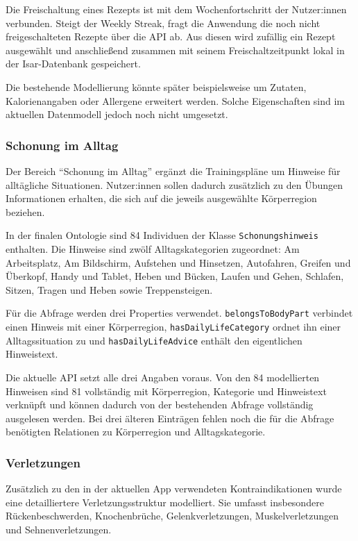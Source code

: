 Die Freischaltung eines Rezepts ist mit dem Wochenfortschritt der Nutzer:innen verbunden. Steigt der Weekly Streak, fragt die Anwendung die noch nicht freigeschalteten Rezepte über die API ab. Aus diesen wird zufällig ein Rezept ausgewählt und anschließend zusammen mit seinem Freischaltzeitpunkt lokal in der Isar-Datenbank gespeichert.

Die bestehende Modellierung könnte später beispielsweise um Zutaten, Kalorienangaben oder Allergene erweitert werden. Solche Eigenschaften sind im aktuellen Datenmodell jedoch noch nicht umgesetzt.

\subsubsection{Schonung im Alltag}
\label{sec:ontologie-schonung}

Der Bereich ``Schonung im Alltag'' ergänzt die Trainingspläne um Hinweise für alltägliche Situationen. Nutzer:innen sollen dadurch zusätzlich zu den Übungen Informationen erhalten, die sich auf die jeweils ausgewählte Körperregion beziehen.

In der finalen Ontologie sind 84 Individuen der Klasse \texttt{Schonungshinweis} enthalten. Die Hinweise sind zwölf Alltagskategorien zugeordnet: Am Arbeitsplatz, Am Bildschirm, Aufstehen und Hinsetzen, Autofahren, Greifen und Überkopf, Handy und Tablet, Heben und Bücken, Laufen und Gehen, Schlafen, Sitzen, Tragen und Heben sowie Treppensteigen.


Für die Abfrage werden drei Properties verwendet. \texttt{belongsToBodyPart} verbindet einen Hinweis mit einer Körperregion, \texttt{hasDailyLifeCategory} ordnet ihn einer Alltagssituation zu und \texttt{hasDailyLifeAdvice} enthält den eigentlichen Hinweistext.

Die aktuelle API setzt alle drei Angaben voraus. Von den 84 modellierten Hinweisen sind 81 vollständig mit Körperregion, Kategorie und Hinweistext verknüpft und können dadurch von der bestehenden Abfrage vollständig ausgelesen werden. Bei drei älteren Einträgen fehlen noch die für die Abfrage benötigten Relationen zu Körperregion und Alltagskategorie.

\subsubsection{Verletzungen}

Zusätzlich zu den in der aktuellen App verwendeten Kontraindikationen wurde eine detailliertere Verletzungsstruktur modelliert. Sie umfasst insbesondere Rückenbeschwerden, Knochenbrüche, Gelenkverletzungen, Muskelverletzungen und Sehnenverletzungen.

